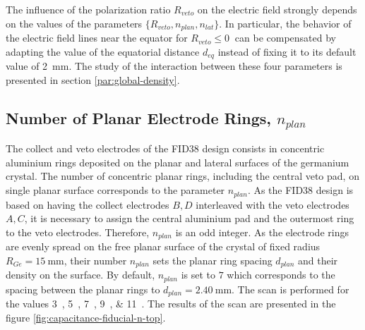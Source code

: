 The influence of the polarization ratio $R_{veto}$ on the electric field strongly depends on the values of the parameters $\{R_{veto}, n_{plan}, n_{lat} \}$. In particular, the behavior of the electric field lines near the equator for $R_{veto} \leq \SI{0}{}$ can be compensated by adapting the value of the equatorial distance $d_{eq}$ instead of fixing it to its default value of \SI{2}{\mm}. The study of the interaction between these four parameters is presented in section \ref{par:global-density}.

\subsection{Number of Planar Electrode Rings, $n_{plan}$}
\label{par:n-plan}

The collect and veto electrodes of the FID38 design consists in concentric aluminium rings deposited on the planar and lateral surfaces of the germanium crystal. The number of concentric planar rings, including the central veto pad, on single planar surface corresponds to the parameter $n_{plan}$.
As the FID38 design is based on having the collect electrodes $B,D$ interleaved with the veto electrodes $A,C$, it is necessary to assign the central aluminium pad and the outermost ring to the veto electrodes. Therefore, $n_{plan}$ is an odd integer. As the electrode rings are evenly spread on the free planar surface of the crystal of fixed radius $R_{Ge}=\SI{15}{\mm}$, their number $n_{plan}$ sets the planar ring spacing $d_{plan}$ and their density on the surface.
By default, $n_{plan}$ is set to $7$ which corresponds to the spacing between the planar rings to $d_{plan}=\SI{2.40}{\mm}$.  The scan is performed for the values \SIlist{3;5;7;9;11}{}. The results of the scan are presented in the figure \ref{fig:capacitance-fiducial-n-top}.

